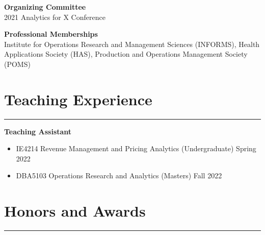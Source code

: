 \documentclass[12pt, a4paper]{article}
\begin{document}
{	%

	

\raggedright\textbf{Organizing Committee}\\
2021 \hspace*{10mm} Analytics for X Conference

\raggedright\textbf{Professional Memberships}\\
Institute for Operations Research and Management Sciences (INFORMS), Health Applications Society (HAS), Production and Operations Management Society (POMS)




\section*{Teaching Experience}
\vspace*{0.4em}
\hrule height 0.5pt
\raggedright\textbf{Teaching Assistant}
\begin{itemize}[leftmargin=36pt, itemsep=2pt, parsep=0pt, topsep=-0.5em]

	\item IE4214 Revenue Management and Pricing Analytics (Undergraduate) \hfill Spring 2022

	\item DBA5103 Operations Research and Analytics (Masters) \hfill Fall 2022

\end{itemize}




\section*{Honors and Awards}
\vspace*{0.4em}
\hrule height 0.5pt
\begin{itemize}[leftmargin=36pt, itemsep=1pt, parsep=0.5pt, topsep=1pt]


\end{itemize}}
\end{document}
